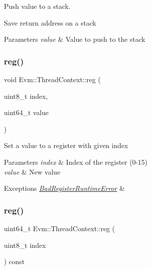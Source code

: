 Push value to a stack. 

Save return address on a stack 
\begin{DoxyParams}{Parameters}
{\em value} & Value to push to the stack \\
\hline
\end{DoxyParams}
\mbox{\label{struct_evm_1_1_thread_context_ae095ee4a87d555fa4c3a55584b058ebb}} 
\subsubsection{\texorpdfstring{reg()}{reg()}\hspace{0.1cm}{\footnotesize\ttfamily [1/2]}}
{\footnotesize\ttfamily void Evm\+::\+Thread\+Context\+::reg (\begin{DoxyParamCaption}\item[{uint8\+\_\+t}]{index,  }\item[{uint64\+\_\+t}]{value }\end{DoxyParamCaption})}

Set a value to a register with given index 
\begin{DoxyParams}{Parameters}
{\em index} & Index of the register (0-\/15) \\
\hline
{\em value} & New value \\
\hline
\end{DoxyParams}

\begin{DoxyExceptions}{Exceptions}
{\em \mbox{\hyperlink{struct_evm_1_1_bad_register_runtime_error}{Bad\+Register\+Runtime\+Error}}} & \\
\hline
\end{DoxyExceptions}
\mbox{\label{struct_evm_1_1_thread_context_a7a599a3cce4260d4c54be752e20bace8}} 
\subsubsection{\texorpdfstring{reg()}{reg()}\hspace{0.1cm}{\footnotesize\ttfamily [2/2]}}
{\footnotesize\ttfamily uint64\+\_\+t Evm\+::\+Thread\+Context\+::reg (\begin{DoxyParamCaption}\item[{uint8\+\_\+t}]{index }\end{DoxyParamCaption}) const}

